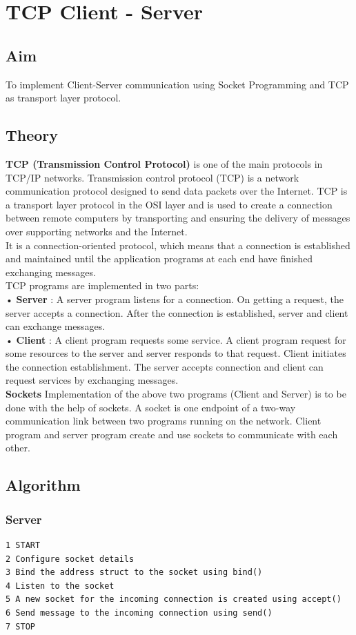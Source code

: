 \section{TCP Client - Server}
\subsection{Aim}
To implement Client-Server communication using Socket Programming and TCP as
transport layer protocol.

\subsection{Theory}
\textbf{TCP (Transmission Control Protocol)} is one of the main protocols in TCP/IP
networks. Transmission control protocol (TCP) is a network communication protocol designed to send data packets over the Internet. TCP is a transport layer protocol
in the OSI layer and is used to create a connection between remote computers by
transporting and ensuring the delivery of messages over supporting networks and
the Internet.\\
It is a connection-oriented protocol, which means that a connection is established
and maintained until the application programs at each end have finished exchanging
messages.\\
TCP programs are implemented in two parts:\\
• \textbf{Server} : A server program listens for a connection. On getting a request,
the server accepts a connection. After the connection is established, server
and client can exchange messages.\\
• \textbf{Client} : A client program requests some service. A client program request
for some resources to the server and server responds to that request. Client
initiates the connection establishment. The server accepts connection and
client can request services by exchanging messages.\\
\textbf{Sockets}
Implementation of the above two programs (Client and Server) is to be done with
the help of sockets. A socket is one endpoint of a two-way communication link
between two programs running on the network. Client program and server program
create and use sockets to communicate with each other.

\subsection{Algorithm}
\subsubsection{Server}
\begin{verbatim}
1 START
2 Configure socket details
3 Bind the address struct to the socket using bind()
4 Listen to the socket
5 A new socket for the incoming connection is created using accept()
6 Send message to the incoming connection using send()
7 STOP
\end{verbatim}

